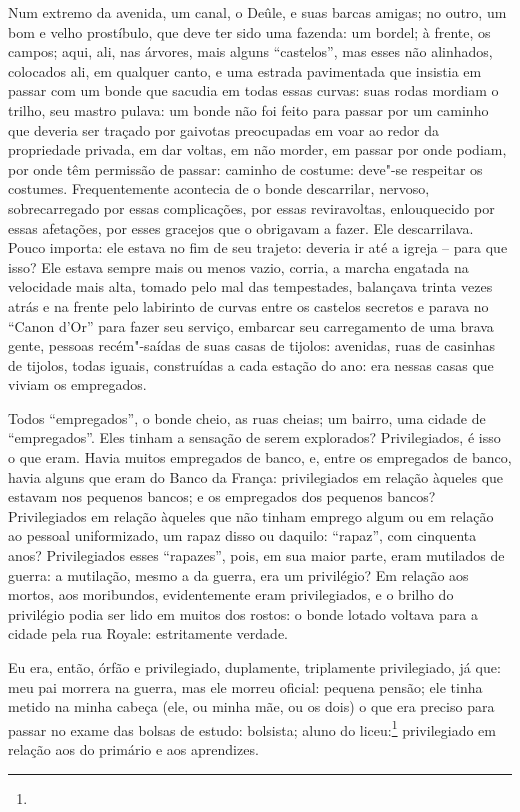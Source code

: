 Num extremo da avenida, um canal, o Deûle, e suas barcas amigas; no
outro, um bom e velho prostíbulo, que deve ter sido uma fazenda: um
bordel; à frente, os campos; aqui, ali, nas árvores, mais alguns ``castelos'',
mas esses não alinhados, colocados ali, em qualquer canto, e uma
estrada pavimentada que insistia em passar com um bonde que sacudia em
todas essas curvas: suas rodas mordiam o trilho, seu mastro pulava: um
bonde não foi feito para passar por um caminho que deveria ser traçado
por gaivotas preocupadas em voar ao redor da propriedade privada, em dar
voltas, em não morder, em passar por onde podiam, por onde têm permissão
de passar: caminho de costume: deve"-se respeitar os costumes.
Frequentemente acontecia de o bonde descarrilar, nervoso, sobrecarregado
por essas complicações, por essas reviravoltas, enlouquecido por essas
afetações, por esses gracejos que o obrigavam a fazer. Ele descarrilava.
Pouco importa: ele estava no fim de seu trajeto: deveria ir até a igreja
-- para que isso? Ele estava sempre mais ou menos vazio, corria, a
marcha engatada na velocidade mais alta, tomado pelo mal das
tempestades, balançava trinta vezes atrás e na frente pelo labirinto de
curvas entre os castelos secretos e parava no ``Canon d'Or'' para fazer
seu serviço, embarcar seu carregamento de uma brava gente, pessoas
recém"-saídas de suas casas de tijolos: avenidas, ruas de casinhas de
tijolos, todas iguais, construídas a cada estação do ano: era nessas
casas que viviam os empregados.

Todos ``empregados'', o bonde cheio, as ruas cheias; um bairro, uma
cidade de ``empregados''. Eles tinham a sensação de serem explorados?
Privilegiados, é isso o que eram. Havia muitos empregados de banco, e,
entre os empregados de banco, havia alguns que eram do Banco da França:
privilegiados em relação àqueles que estavam nos pequenos bancos; e os
empregados dos pequenos bancos? Privilegiados em relação àqueles que não
tinham emprego algum ou em relação ao pessoal uniformizado, um
rapaz disso
ou daquilo: ``rapaz'', com cinquenta anos? Privilegiados esses
``rapazes'', pois, em sua maior parte, eram mutilados de guerra: a
mutilação, mesmo a da guerra, era um privilégio? Em relação aos mortos,
aos moribundos, evidentemente eram privilegiados, e o brilho do
privilégio podia ser lido em muitos dos rostos: o bonde lotado voltava
para a cidade pela rua Royale: estritamente verdade.

Eu era, então, órfão e privilegiado, duplamente, triplamente
privilegiado, já que: meu pai morrera na guerra, mas ele morreu oficial:
pequena pensão; ele tinha metido na minha cabeça (ele, ou minha mãe, ou
os dois) o que era preciso para passar no exame das bolsas de estudo:
bolsista; aluno do liceu:\protect\footnote{} privilegiado em
relação aos do primário e aos aprendizes.

